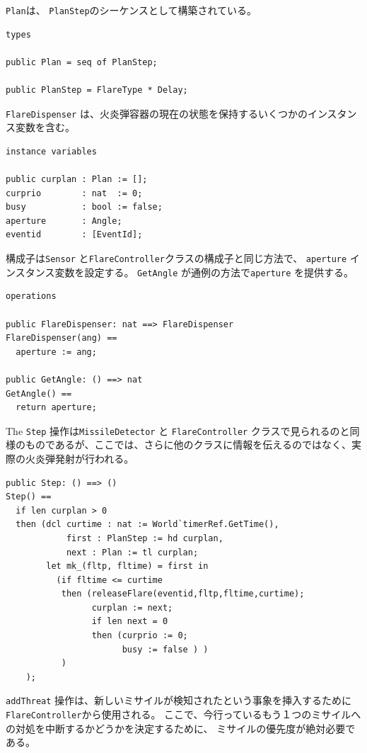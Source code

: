 \documentclass[\pformat,12pt]{jreport}
\begin{document}
\texttt{Plan}は、 \texttt{PlanStep}のシーケンスとして構築されている。

\begin{lstlisting}
types

public Plan = seq of PlanStep;

public PlanStep = FlareType * Delay;
\end{lstlisting}

\texttt{FlareDispenser} は、火炎弾容器の現在の状態を保持するいくつかのインスタンス変数を含む。

\begin{lstlisting}
instance variables

public curplan : Plan := [];
curprio        : nat  := 0;
busy           : bool := false;
aperture       : Angle;
eventid        : [EventId];
\end{lstlisting}

構成子は\texttt{Sensor} と\texttt{FlareController}クラスの構成子と同じ方法で、 \texttt{aperture} インスタンス変数を設定する。
 \texttt{GetAngle} が通例の方法で\texttt{aperture} を提供する。

\begin{lstlisting}
operations

public FlareDispenser: nat ==> FlareDispenser
FlareDispenser(ang) ==
  aperture := ang;

public GetAngle: () ==> nat
GetAngle() ==
  return aperture;
\end{lstlisting}

The \texttt{Step} 操作は\texttt{MissileDetector} と \texttt{FlareController} クラスで見られるのと同様のものであるが、ここでは、さらに他のクラスに情報を伝えるのではなく、実際の火炎弾発射が行われる。


\begin{lstlisting}
public Step: () ==> ()
Step() ==
  if len curplan > 0
  then (dcl curtime : nat := World`timerRef.GetTime(),
            first : PlanStep := hd curplan,
            next : Plan := tl curplan;
        let mk_(fltp, fltime) = first in
          (if fltime <= curtime
           then (releaseFlare(eventid,fltp,fltime,curtime);
                 curplan := next;
                 if len next = 0
                 then (curprio := 0; 
                       busy := false ) )
           )
    );
\end{lstlisting}

 \texttt{addThreat} 操作は、新しいミサイルが検知されたという事象を挿入するために \texttt{FlareController}から使用される。
ここで、今行っているもう１つのミサイルへの対処を中断するかどうかを決定するために、 ミサイルの優先度が絶対必要である。
\end{document}
